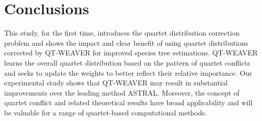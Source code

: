 \documentclass[runningheads]{llncs}
\begin{document}
\vspace{-10pt}
\section{Conclusions}
\vspace{-8pt}
This study, for the first time, introduces the quartet distribution correction problem and shows the impact and clear benefit of using quartet distributions corrected by QT-WEAVER for improved species tree estimations. %
QT-WEAVER learns the overall quartet distribution based on the pattern of quartet conflicts and seeks to update the weights to better reflect their relative importance. Our experimental study shows that QT-WEAVER may result in substantial improvements over the leading method ASTRAL. Moreover, the concept of quartet conflict and related theoretical results have broad applicability and will be valuable for a range of quartet-based computational methods. 
\end{document}
